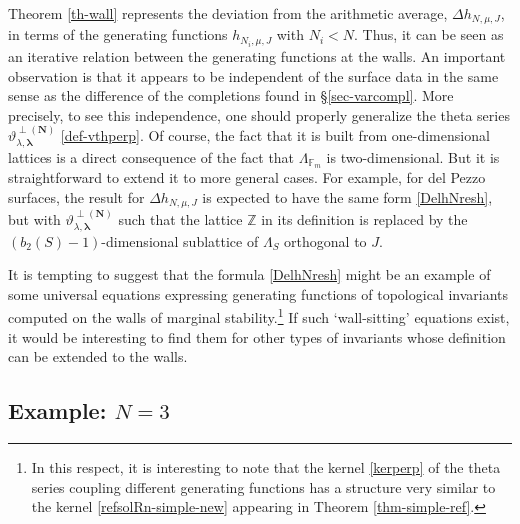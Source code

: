 \documentclass[12pt,letterpaper]{JHEP3}
\newcommand{\vth}{\vartheta}
\newcommand{\IZ}{\mathds{Z}}
\newcommand{\IF}{\mathds{F}}
\newcommand{\bfN}{{\boldsymbol N}}
\newcommand{\bflam}{{\boldsymbol \lambda}}
\def\vth{\vartheta}
\begin{document}
Theorem \ref{th-wall} represents the deviation from the arithmetic average, $\Delta h_{N,\mu,J}$, 
in terms of the generating functions $h_{N_i,\mu,J}$ with $N_i<N$.
Thus, it can be seen as an iterative relation between the generating functions at the walls.
An important observation is that it appears to be independent of the surface data in the same sense as the difference of 
the completions found in \S\ref{sec-varcompl}.
More precisely, to see this independence, one should properly generalize 
the theta series $\vth^{\perp(\bfN)}_{\lambda,\bflam}$ \eqref{def-vthperp}. 
Of course, the fact that it is built from one-dimensional 
lattices is a direct consequence of the fact that $\Lambda_{\IF_m}$ is two-dimensional.
But it is straightforward to extend it to more general cases.
For example, for del Pezzo surfaces, the result for $\Delta h_{N,\mu,J}$ is expected to have the same form \eqref{DelhNresh},
but with $\vth^{\perp(\bfN)}_{\lambda,\bflam}$ such that the lattice $\IZ$ in its definition 
is replaced by the $(b_2(S)-1)$-dimensional sublattice of $\Lambda_S$ orthogonal to $J$.

It is tempting to suggest that the formula \eqref{DelhNresh} might be an example of some universal equations expressing 
generating functions of topological invariants computed on the walls of marginal stability.\footnote{In this respect, 
	it is interesting to note that the kernel \eqref{kerperp} of the theta series coupling different generating functions 
	has a structure very similar to the kernel \eqref{refsolRn-simple-new} appearing in Theorem \ref{thm-simple-ref}.}
If such `wall-sitting' equations exist, it would be interesting to find them for other types of invariants 
whose definition can be extended to the walls.




\subsection{Example: $N=3$}
\label{subsec-n3}
\end{document}
